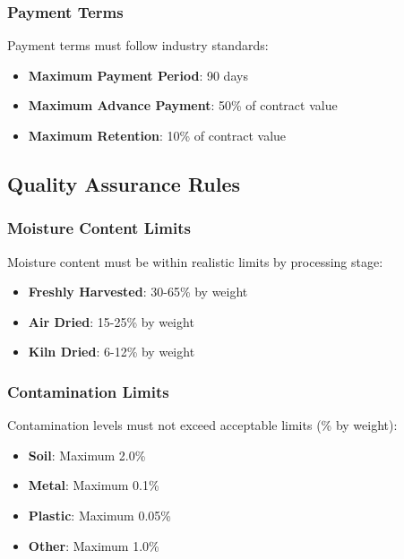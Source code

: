 \subsubsection{Payment Terms}

Payment terms must follow industry standards:

\begin{itemize}
    \item \textbf{Maximum Payment Period}: 90 days
    \item \textbf{Maximum Advance Payment}: 50\% of contract value
    \item \textbf{Maximum Retention}: 10\% of contract value
\end{itemize}

\subsection{Quality Assurance Rules}
\label{sec:quality-assurance}

\subsubsection{Moisture Content Limits}

Moisture content must be within realistic limits by processing stage:

\begin{itemize}
    \item \textbf{Freshly Harvested}: 30-65\% by weight
    \item \textbf{Air Dried}: 15-25\% by weight
    \item \textbf{Kiln Dried}: 6-12\% by weight
\end{itemize}

\subsubsection{Contamination Limits}

Contamination levels must not exceed acceptable limits (\% by weight):

\begin{itemize}
    \item \textbf{Soil}: Maximum 2.0\%
    \item \textbf{Metal}: Maximum 0.1\%
    \item \textbf{Plastic}: Maximum 0.05\%
    \item \textbf{Other}: Maximum 1.0\%
\end{itemize}

